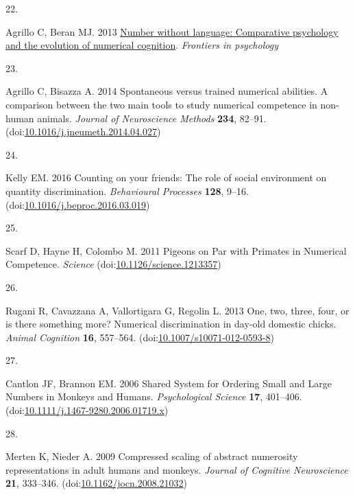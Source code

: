 \documentclass[
  ,doc,floatsintext]{apa6}
\newlength{\cslhangindent}
\newlength{\csllabelwidth}
\newlength{\cslentryspacingunit} %
\newenvironment{CSLReferences}[2] %
 {%
  \setlength{\parindent}{0pt}
  \ifodd #1
  \let\oldpar\par
  \def\par{\hangindent=\cslhangindent\oldpar}
  \fi
  \setlength{\parskip}{#2\cslentryspacingunit}
 }%
 {}
\newcommand{\CSLLeftMargin}[1]{\parbox[t]{\csllabelwidth}{#1}}
\newcommand{\CSLRightInline}[1]{\parbox[t]{\linewidth - \csllabelwidth}{#1}\break}
\begin{document}
\begin{CSLReferences}{0}{0}
\leavevmode{}%
\CSLLeftMargin{22. }%
\CSLRightInline{Agrillo C, Beran MJ. 2013 \href{https://www.academia.edu/6879466/Number_without_language_comparative_psychology_and_the_evolution_of_numerical_cognition}{Number without language: Comparative psychology and the evolution of numerical cognition}. \emph{Frontiers in psychology} }

\leavevmode{}%
\CSLLeftMargin{23. }%
\CSLRightInline{Agrillo C, Bisazza A. 2014 Spontaneous versus trained numerical abilities. {A} comparison between the two main tools to study numerical competence in non-human animals. \emph{Journal of Neuroscience Methods} \textbf{234}, 82--91. (doi:\href{https://doi.org/10.1016/j.jneumeth.2014.04.027}{10.1016/j.jneumeth.2014.04.027})}

\leavevmode{}%
\CSLLeftMargin{24. }%
\CSLRightInline{Kelly EM. 2016 Counting on your friends: {The} role of social environment on quantity discrimination. \emph{Behavioural Processes} \textbf{128}, 9--16. (doi:\href{https://doi.org/10.1016/j.beproc.2016.03.019}{10.1016/j.beproc.2016.03.019})}

\leavevmode{}%
\CSLLeftMargin{25. }%
\CSLRightInline{Scarf D, Hayne H, Colombo M. 2011 Pigeons on {Par} with {Primates} in {Numerical} {Competence}. \emph{Science} (doi:\href{https://doi.org/10.1126/science.1213357}{10.1126/science.1213357})}

\leavevmode{}%
\CSLLeftMargin{26. }%
\CSLRightInline{Rugani R, Cavazzana A, Vallortigara G, Regolin L. 2013 One, two, three, four, or is there something more? {Numerical} discrimination in day-old domestic chicks. \emph{Animal Cognition} \textbf{16}, 557--564. (doi:\href{https://doi.org/10.1007/s10071-012-0593-8}{10.1007/s10071-012-0593-8})}

\leavevmode{}%
\CSLLeftMargin{27. }%
\CSLRightInline{Cantlon JF, Brannon EM. 2006 Shared {System} for {Ordering} {Small} and {Large} {Numbers} in {Monkeys} and {Humans}. \emph{Psychological Science} \textbf{17}, 401--406. (doi:\href{https://doi.org/10.1111/j.1467-9280.2006.01719.x}{10.1111/j.1467-9280.2006.01719.x})}

\leavevmode{}%
\CSLLeftMargin{28. }%
\CSLRightInline{Merten K, Nieder A. 2009 Compressed scaling of abstract numerosity representations in adult humans and monkeys. \emph{Journal of Cognitive Neuroscience} \textbf{21}, 333--346. (doi:\href{https://doi.org/10.1162/jocn.2008.21032}{10.1162/jocn.2008.21032})}


\end{CSLReferences}
\end{document}
